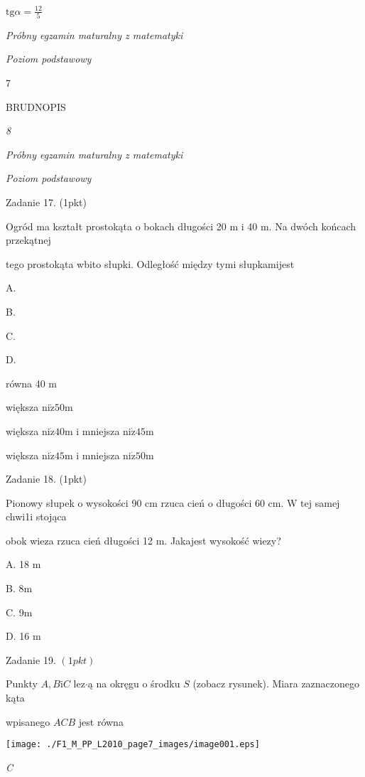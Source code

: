 \documentclass[a4paper,12pt]{article}
\begin{document}
$\displaystyle \mathrm{t}\mathrm{g}\alpha=\frac{12}{5}$





{\it Próbny egzamin maturalny z matematyki}

{\it Poziom podstawowy}

7

BRUDNOPIS





{\it 8}

{\it Próbny egzamin maturalny z matematyki}

{\it Poziom podstawowy}

Zadanie 17. (1pkt)

Ogród ma kształt prostokąta o bokach długości 20 m i 40 m. Na dwóch końcach przekątnej

tego prostokąta wbito słupki. Odległość między tymi słupkamijest

A.

B.

C.

D.

równa 40 $\mathrm{m}$

większa $\mathrm{n}\mathrm{i}\dot{\mathrm{z}}50\mathrm{m}$

większa $\mathrm{n}\mathrm{i}\dot{\mathrm{z}}40\mathrm{m}$ i mniejsza $\mathrm{n}\mathrm{i}\dot{\mathrm{z}}45\mathrm{m}$

większa $\mathrm{n}\mathrm{i}\dot{\mathrm{z}}45\mathrm{m}$ i mniejsza $\mathrm{n}\mathrm{i}\dot{\mathrm{z}}50\mathrm{m}$

Zadanie 18. (1pkt)

Pionowy słupek o wysokości 90 cm rzuca cień o długości 60 cm. W tej samej chwi1i stojąca

obok wieza rzuca cień długości 12 m. Jakajest wysokość wiezy?

A. 18 m

B. 8m

C. 9m

D. 16 m

Zadanie 19. $(1pkt)$

Punkty $A, B \mathrm{i} C$ lez$\cdot$ą na okręgu o środku $S$ (zobacz rysunek). Miara zaznaczonego kąta

wpisanego $ACB$ jest równa
\begin{center}
\texttt{[image: ./F1\_M\_PP\_L2010\_page7\_images/image001.eps]}
\end{center}
{\it C}
\end{document}
